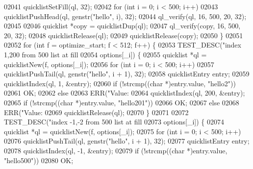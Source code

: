 \begin{DoxyCode}
{{{{{{{{{{{{{{{{{{{{{{{{{{{{{{{{{{{{{{{{{{{{{{{{{{{{{{{{{{{{02041             quicklistSetFill(ql, 32);
02042             \textcolor{keywordflow}{for} (\textcolor{keywordtype}{int} i = 0; i < 500; i++)
02043                 quicklistPushHead(ql, genstr(\textcolor{stringliteral}{"hello"}, i), 32);
02044             ql\_verify(ql, 16, 500, 20, 32);
02045 
02046             quicklist *copy = quicklistDup(ql);
02047             ql\_verify(copy, 16, 500, 20, 32);
02048             quicklistRelease(ql);
02049             quicklistRelease(copy);
02050         \}
02051 
02052         \textcolor{keywordflow}{for} (\textcolor{keywordtype}{int} f = optimize\_start; f < 512; f++) \{
02053             TEST\_DESC(\textcolor{stringliteral}{"index 1,200 from 500 list at fill %
02054                       options[\_i]) \{
02055                 quicklist *ql = quicklistNew(f, options[\_i]);
02056                 \textcolor{keywordflow}{for} (\textcolor{keywordtype}{int} i = 0; i < 500; i++)
02057                     quicklistPushTail(ql, genstr(\textcolor{stringliteral}{"hello"}, i + 1), 32);
02058                 quicklistEntry entry;
02059                 quicklistIndex(ql, 1, &entry);
02060                 \textcolor{keywordflow}{if} (!strcmp((\textcolor{keywordtype}{char} *)entry.value, \textcolor{stringliteral}{"hello2"}))
02061                     OK;
02062                 \textcolor{keywordflow}{else}
02063                     ERR(\textcolor{stringliteral}{"Value: %
02064                 quicklistIndex(ql, 200, &entry);
02065                 \textcolor{keywordflow}{if} (!strcmp((\textcolor{keywordtype}{char} *)entry.value, \textcolor{stringliteral}{"hello201"}))
02066                     OK;
02067                 \textcolor{keywordflow}{else}
02068                     ERR(\textcolor{stringliteral}{"Value: %
02069                 quicklistRelease(ql);
02070             \}
02071 
02072             TEST\_DESC(\textcolor{stringliteral}{"index -1,-2 from 500 list at fill %
02073                       options[\_i]) \{
02074                 quicklist *ql = quicklistNew(f, options[\_i]);
02075                 \textcolor{keywordflow}{for} (\textcolor{keywordtype}{int} i = 0; i < 500; i++)
02076                     quicklistPushTail(ql, genstr(\textcolor{stringliteral}{"hello"}, i + 1), 32);
02077                 quicklistEntry entry;
02078                 quicklistIndex(ql, -1, &entry);
02079                 \textcolor{keywordflow}{if} (!strcmp((\textcolor{keywordtype}{char} *)entry.value, \textcolor{stringliteral}{"hello500"}))
02080                     OK;
}}}}}}}}}}}}}}}}}}}}}}}}}}}}}}}}}}}}}}}}}}}}}}}}}}}}}}}}}}}}}}}}
\end{DoxyCode}
